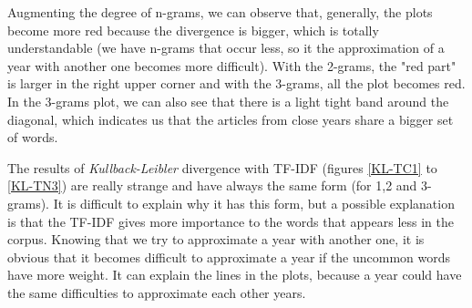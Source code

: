 Augmenting the degree of n-grams, we can observe that, generally, the plots become more red because the divergence is bigger, which is totally understandable (we have n-grams that occur less, so it the approximation of a year with another one becomes more difficult). With the 2-grams, the "red part" is larger in the right upper corner and with the 3-grams, all the plot becomes red. In the 3-grams plot, we can also see that there is a light tight band around the diagonal, which indicates us that the articles from close years share a bigger set of words.

The results of \emph{Kullback-Leibler} divergence with TF-IDF (figures \ref{KL-TC1} to \ref{KL-TN3}) are really strange and have always the same form (for 1,2 and 3-grams). It is difficult to explain why it has this form, but a possible explanation is that the TF-IDF gives more importance to the words that appears less in the corpus. Knowing that we try to approximate a year with another one, it is obvious that it becomes difficult to approximate a year if the uncommon words have more weight. It can explain the lines in the plots, because a year could have the same difficulties to approximate each other years.